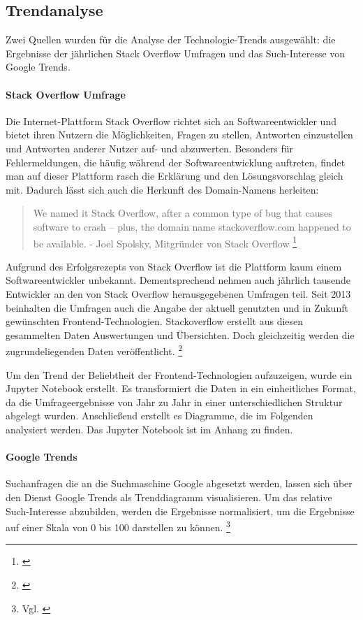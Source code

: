 

\subsection{Trendanalyse}

Zwei Quellen wurden für die Analyse der Technologie-Trends ausgewählt: die Ergebnisse der jährlichen Stack Overflow Umfragen und das Such-Interesse von Google Trends. 

\paragraph{Stack Overflow Umfrage}
Die Internet-Plattform Stack Overflow richtet sich an Softwareentwickler und bietet ihren Nutzern die Möglichkeiten, Fragen zu stellen, Antworten einzustellen und Antworten anderer Nutzer auf- und abzuwerten. 
Besonders für Fehlermeldungen, die häufig während der Softwareentwicklung auftreten, findet man auf dieser Plattform rasch die Erklärung und den Lösungsvorschlag gleich mit. Dadurch lässt sich auch die Herkunft des Domain-Namens herleiten:

\begin{quotation}
We named it Stack Overflow, after a common type of bug that causes software to crash -- plus, the domain name stackoverflow.com happened to be available. - Joel Spolsky, Mitgründer von Stack Overflow \footnote{\cite{TheUnprovenPath}}
\end{quotation}

Aufgrund des Erfolgsrezepts von Stack Overflow ist die Plattform kaum einem Softwareentwickler unbekannt. Dementsprechend nehmen auch jährlich tausende Entwickler an den von Stack Overflow herausgegebenen Umfragen teil. Seit  2013 beinhalten die Umfragen auch die Angabe der aktuell genutzten und in Zukunft gewünschten Frontend-Technologien.
Stackoverflow erstellt aus diesen gesammelten Daten Auswertungen und Übersichten. Doch gleichzeitig werden die zugrundeliegenden Daten veröffentlicht. \footnote{\cite{StackOverflowInsights}} 

Um den Trend der Beliebtheit der Frontend-Technologien aufzuzeigen, wurde ein Jupyter Notebook erstellt. Es transformiert die Daten in ein einheitliches Format, da die  Umfrageergebnisse von Jahr zu Jahr in einer unterschiedlichen Struktur abgelegt wurden. Anschließend erstellt es Diagramme, die im Folgenden analysiert werden. Das Jupyter Notebook ist im  Anhang zu finden.

\paragraph{Google Trends} Suchanfragen die an die Suchmaschine Google  abgesetzt werden, lassen sich  über den Dienst Google Trends  als Trenddiagramm visualisieren. Um das relative Such-Interesse abzubilden, werden die Ergebnisse normalisiert, um die Ergebnisse auf einer Skala von 0 bis 100 darstellen zu können. \footnote{Vgl. \cite{GoogleTrendsHilfe}}

